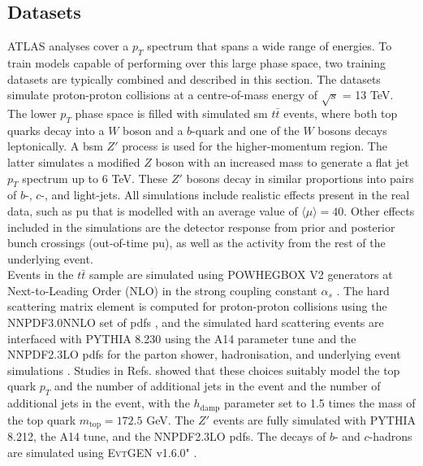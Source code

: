 \subsection{Datasets}\label{ftagdatasets}
ATLAS analyses cover a $p_T$ spectrum that spans a wide range of energies. To train models capable of performing over this large phase space, two training datasets are typically combined and described in this section. The datasets simulate proton-proton collisions at a centre-of-mass energy of $\sqrt{s}$ = 13 TeV. The lower $p_T$ phase space is filled with simulated \gls{sm} $t\bar{t}$ events, where both top quarks decay into a $W$ boson and a $b$-quark and one of the $W$ bosons decays leptonically. A \gls{bsm} $Z'$ process is used for the higher-momentum region. The latter simulates a modified $Z$ boson with an increased mass to generate a flat jet $p_T$ spectrum up to 6 TeV. These $Z'$ bosons decay in similar proportions into pairs of $b$-, $c$-, and light-jets. All simulations include realistic effects present in the real data, such as \gls{pu} that is modelled with an average value of $ \langle\mu\rangle = 40$. Other effects included in the simulations are the detector response from prior and posterior bunch crossings (out-of-time \gls{pu}), as well as the activity from the rest of the underlying event. \\

Events in the $t\bar{t}$ sample are simulated using \textsc{POWHEGBOX V2} generators at Next-to-Leading Order (NLO) in the strong coupling constant $\alpha_s$ \cite{PaoloNason_2004, StefanoFrixione_2007, StefanoFrixione_20072, POWHEGBOX}. The hard scattering matrix element is computed for proton-proton collisions using the \textsc{NNPDF3.0NNLO} set of \glspl{pdf} \cite{PDFLHCrun2}, and the simulated hard scattering events are interfaced with \textsc{PYTHIA 8.230} \cite{SJOSTRAND2015159} using the A14 parameter tune \cite{ATL-PHYS-PUB-2014-021} and the \textsc{NNPDF2.3LO} \glspl{pdf} for the parton shower, hadronisation, and underlying event simulations \cite{BALL2013244}. Studies in Refs. \cite{ATL-PHYS-PUB-2016-020, ATL-PHYS-PUB-2020-023} showed that these choices suitably model the top quark $p_T$ and the number of additional jets in the event and the number of additional jets in the event, with the $h_{\textrm{damp}}$ parameter set to 1.5 times the mass of the top quark $m_{\textrm{top}} = 172.5$ GeV. The $Z'$ events are fully simulated with \textsc{PYTHIA 8.212}, the A14 tune, and the \textsc{NNPDF2.3LO} \glspl{pdf}. The decays of $b$- and $c$-hadrons are simulated using \textsc{EvtGEN} v1.6.0" \cite{LANGE2001152}. \\

